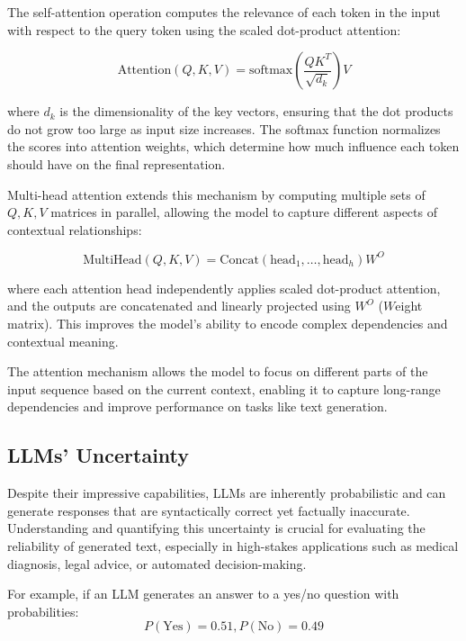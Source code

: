The self-attention operation computes the relevance of each token in the input with
respect to the query token using the scaled dot-product attention:

\begin{displaymath}
  \mbox{Attention}(Q, K, V) = \mbox{softmax}\left(\frac{QK^{T}}{\sqrt{d_{k}}}\right
  ) V
\end{displaymath}

where $d_{k}$ is the dimensionality of the key vectors, ensuring that the dot products
do not grow too large as input size increases. The softmax function normalizes
the scores into attention weights, which determine how much influence each token
should have on the final representation.

Multi-head attention extends this mechanism by computing multiple sets of $Q,K,V$
matrices in parallel, allowing the model to capture different aspects of
contextual relationships:

\begin{displaymath}
  \mbox{MultiHead}(Q, K, V) = \mbox{Concat}(\mbox{head}_{1}, \dots, \mbox{head}_{h}
  ) W^{O}
\end{displaymath}

where each attention head independently applies scaled dot-product attention,
and the outputs are concatenated and linearly projected using $W^{O}$ ($W$eight
matrix). This improves the model's ability to encode complex dependencies and
contextual meaning.

The attention mechanism allows the model to focus on different parts of the
input sequence based on the current context, enabling it to capture long-range dependencies
and improve performance on tasks like text generation.

\subsection{LLMs' Uncertainty}
\label{sub:llms_uncertainty}

Despite their impressive capabilities, LLMs are inherently probabilistic and can
generate responses that are syntactically correct yet factually inaccurate.
Understanding and quantifying this uncertainty is crucial for evaluating the
reliability of generated text, especially in high-stakes applications such as medical
diagnosis, legal advice, or automated decision-making.

For example, if an LLM generates an answer to a yes/no question with
probabilities:
\begin{displaymath}
  P(\mbox{Yes})=0.51,P(\mbox{No})=0.49
\end{displaymath}

